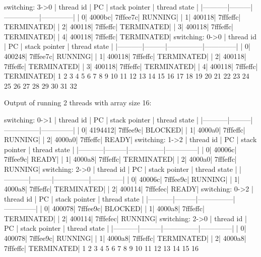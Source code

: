 \documentclass[a4paper]{article}
\begin{document}
\begin{textcode}
switching: 3->0
| thread id |      PC | stack pointer | thread state |
|-----------|---------|---------------|--------------|
|          0|   4000bc|       7fffee7c|       RUNNING|
|          1|   400118|       7fffeffc|    TERMINATED|
|          2|   400118|       7fffeffc|    TERMINATED|
|          3|   400118|       7fffeffc|    TERMINATED|
|          4|   400118|       7fffeffc|    TERMINATED|
switching: 0->0
| thread id |      PC | stack pointer | thread state |
|-----------|---------|---------------|--------------|
|          0|   400248|       7fffee7c|       RUNNING|
|          1|   400118|       7fffeffc|    TERMINATED|
|          2|   400118|       7fffeffc|    TERMINATED|
|          3|   400118|       7fffeffc|    TERMINATED|
|          4|   400118|       7fffeffc|    TERMINATED|
1 2 3 4 5 6 7 8 9 10 11 12 13 14 15 16 17 18 19 20 21 22 23 24 25 26 27 28 29 30 31 32
\end{textcode}


\newpage


Output of running 2 threads with array size 16:

\begin{textcode}
switching: 0->1
| thread id |      PC | stack pointer | thread state |
|-----------|---------|---------------|--------------|
|          0|  4194412|       7fffee9c|       BLOCKED|
|          1|   4000a0|       7fffeffc|       RUNNING|
|          2|   4000a0|       7fffeffc|         READY|
switching: 1->2
| thread id |      PC | stack pointer | thread state |
|-----------|---------|---------------|--------------|
|          0|   40006c|       7fffee9c|         READY|
|          1|   4000a8|       7fffeffc|    TERMINATED|
|          2|   4000a0|       7fffeffc|       RUNNING|
switching: 2->0
| thread id |      PC | stack pointer | thread state |
|-----------|---------|---------------|--------------|
|          0|   40006c|       7fffee9c|       RUNNING|
|          1|   4000a8|       7fffeffc|    TERMINATED|
|          2|   400114|       7fffefec|         READY|
switching: 0->2
| thread id |      PC | stack pointer | thread state |
|-----------|---------|---------------|--------------|
|          0|   400078|       7fffee9c|       BLOCKED|
|          1|   4000a8|       7fffeffc|    TERMINATED|
|          2|   400114|       7fffefec|       RUNNING|
switching: 2->0
| thread id |      PC | stack pointer | thread state |
|-----------|---------|---------------|--------------|
|          0|   400078|       7fffee9c|       RUNNING|
|          1|   4000a8|       7fffeffc|    TERMINATED|
|          2|   4000a8|       7fffeffc|    TERMINATED|
1 2 3 4 5 6 7 8 9 10 11 12 13 14 15 16
\end{textcode}
\end{document}

